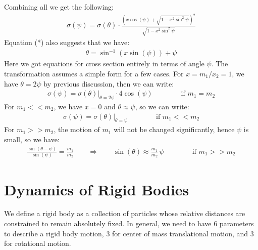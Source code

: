 \documentclass[11pt,oneside]{book}
\theoremstyle{break}
\theoremstyle{break}
\begin{document}
Combining all we get the following:
\begin{align*}
\sigma(\psi) = \sigma(\theta) \cdot \frac{\left( x\cos(\psi) + \sqrt{1-x^2 \sin^2 \psi}\right)^2}{\sqrt{1-x^2 \sin^2 \psi}}
\end{align*}
Equation (*) also suggests that we have:
\begin{align*}
\theta = \sin^{-1}(x\sin(\psi)) + \psi
\end{align*}
Here we got equations for cross section entirely in terms of angle $\psi$. The transformation assumes a simple form for a few cases. For $x = m_1/x_2 = 1$, we have $\theta = 2\psi$ by previous discussion, then we can write:
\begin{align*}
\sigma(\psi) = \left.\sigma(\theta)\right|_{\theta = 2\psi} \cdot 4\cos(\psi) \qquad \qquad \text{if }m_1 = m_2
\end{align*}
For $m_1 << m_2$, we have $x = 0$ and $\theta \approx \psi$, so we can write:
\begin{align*}
\sigma(\psi) =\left. \sigma(\theta) \right|_{\theta = \psi}\qquad \qquad \text{if }m_1 << m_2
\end{align*}
For $m_1 >> m_2$, the motion of $m_1$ will not be changed significantly, hence $\psi$ is small, so we have:
\begin{align*}
\frac{\sin(\theta-\psi)}{\sin(\psi)} = \frac{m_1}{m_2} \qquad \Rightarrow \qquad \sin(\theta) \approx \frac{m_1}{m_2}\,\psi
\qquad \qquad \text{if }m_1 >> m_2
\end{align*}


\newpage
\chapter{Dynamics of Rigid Bodies}

We define a rigid body as a collection of particles whose relative distances are constrained to remain absolutely fixed. In general, we need to have $6$ parameters to describe a rigid body motion, $3$ for center of mass translational motion, and $3$ for rotational motion.\\
\end{document}
